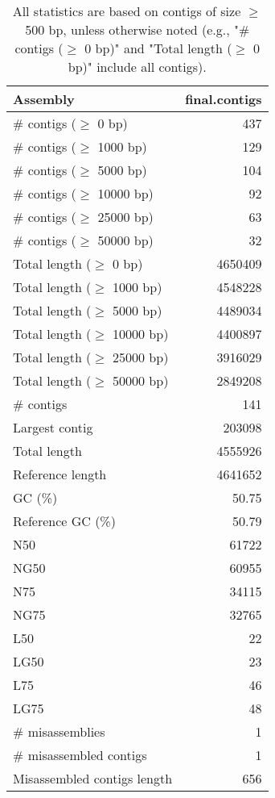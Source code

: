 \documentclass[12pt,a4paper]{article}
\begin{document}
\begin{table}[ht]
\begin{center}
\caption{All statistics are based on contigs of size $\geq$ 500 bp, unless otherwise noted (e.g., "\# contigs ($\geq$ 0 bp)" and "Total length ($\geq$ 0 bp)" include all contigs).}
\begin{tabular}{|l*{1}{|r}|}
\hline
Assembly & final.contigs \\ \hline
\# contigs ($\geq$ 0 bp) & 437 \\ \hline
\# contigs ($\geq$ 1000 bp) & 129 \\ \hline
\# contigs ($\geq$ 5000 bp) & 104 \\ \hline
\# contigs ($\geq$ 10000 bp) & 92 \\ \hline
\# contigs ($\geq$ 25000 bp) & 63 \\ \hline
\# contigs ($\geq$ 50000 bp) & 32 \\ \hline
Total length ($\geq$ 0 bp) & 4650409 \\ \hline
Total length ($\geq$ 1000 bp) & 4548228 \\ \hline
Total length ($\geq$ 5000 bp) & 4489034 \\ \hline
Total length ($\geq$ 10000 bp) & 4400897 \\ \hline
Total length ($\geq$ 25000 bp) & 3916029 \\ \hline
Total length ($\geq$ 50000 bp) & 2849208 \\ \hline
\# contigs & 141 \\ \hline
Largest contig & 203098 \\ \hline
Total length & 4555926 \\ \hline
Reference length & 4641652 \\ \hline
GC (\%) & 50.75 \\ \hline
Reference GC (\%) & 50.79 \\ \hline
N50 & 61722 \\ \hline
NG50 & 60955 \\ \hline
N75 & 34115 \\ \hline
NG75 & 32765 \\ \hline
L50 & 22 \\ \hline
LG50 & 23 \\ \hline
L75 & 46 \\ \hline
LG75 & 48 \\ \hline
\# misassemblies & 1 \\ \hline
\# misassembled contigs & 1 \\ \hline
Misassembled contigs length & 656 \\ \hline

\end{tabular}
\end{center}
\end{table}
\end{document}
